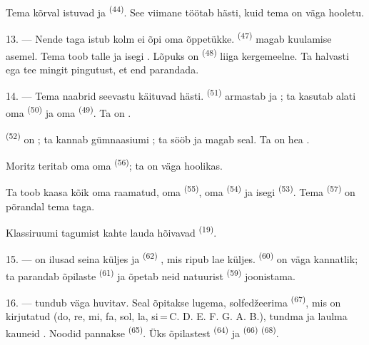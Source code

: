 Tema kõrval istuvad  ja  \textsuperscript{(44)}. See
viimane töötab hästi, kuid tema  on väga hooletu.

13. --- Nende taga istub kolm  ei õpi oma õppetükke.
 \textsuperscript{(47)} magab kuulamise asemel. Tema 
toob talle  ja isegi . Lõpuks on
 \textsuperscript{(48)} liiga kergemeelne. Ta  halvasti
ega tee mingit pingutust, et end parandada.

14. --- Tema naabrid seevastu käituvad hästi.  \textsuperscript{(51)}
armastab  ja ; ta kasutab alati oma
 \textsuperscript{(50)} ja oma 
\textsuperscript{(49)}. Ta on .

 \textsuperscript{(52)} on ; ta kannab
gümnaasiumi ; ta sööb ja magab seal. Ta on hea
.

Moritz teritab oma  oma  \textsuperscript{(56)};
ta on väga hoolikas.

Ta toob kaasa kõik oma raamatud, oma  \textsuperscript{(55)}, oma
 \textsuperscript{(54)} ja isegi 
\textsuperscript{(53)}. Tema  \textsuperscript{(57)} on põrandal tema
taga.

Klassiruumi tagumist kahte lauda hõivavad 
\textsuperscript{(19)}.

\VUsaut{4.6mm}
\VUsaut{3.4mm}

15. ---  on ilusad  seina küljes ja
 \textsuperscript{(62)} , mis ripub lae küljes.
 \textsuperscript{(60)} on väga kannatlik; ta parandab õpilaste
 \textsuperscript{(61)} ja õpetab neid natuurist 
\textsuperscript{(59)} joonistama.

16. ---  tundub väga huvitav. Seal õpitakse 
lugema, solfedžeerima  \textsuperscript{(67)}, mis on kirjutatud
 (do, re, mi, fa, sol, la, si\,=\,C. D. E. F. G. A. B.),
tundma  ja laulma kauneid . Noodid pannakse
 \textsuperscript{(65)}. Üks õpilastest 
\textsuperscript{(64)} ja  \textsuperscript{(66)}  \textsuperscript{(68)}.


